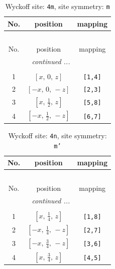 \documentclass[fleqn,8pt]{jsarticle}
\begin{document}
\renewcommand{\arraystretch}{1.2}
\begin{longtable}{ccc}
\caption{Wyckoff site: {\tt 4m}, site symmetry: {\tt m}}
 \\
 \hline \hline
No. & position & mapping \\ \hline \endfirsthead

\multicolumn{2}{l}{\tablename\ \thetable{}} \\
 \hline \hline
No. & position & mapping \\ \hline \endhead

 \hline \hline
\multicolumn{2}{r}{\footnotesize\it continued ...} \\ \endfoot

 \hline \hline
\multicolumn{2}{r}{} \\ \endlastfoot

1 & $\left[ x,\, 0,\, z \right]$ & {\tt [1,4]} \\ \hline
2 & $\left[ - x,\, 0,\, - z \right]$ & {\tt [2,3]} \\ \hline
3 & $\left[ x,\, \frac{1}{2},\, z \right]$ & {\tt [5,8]} \\ \hline
4 & $\left[ - x,\, \frac{1}{2},\, - z \right]$ & {\tt [6,7]} \\
\end{longtable}
\renewcommand{\arraystretch}{1.2}
\begin{longtable}{ccc}
\caption{Wyckoff site: {\tt 4n}, site symmetry: {\tt m'}}
 \\
 \hline \hline
No. & position & mapping \\ \hline \endfirsthead

\multicolumn{2}{l}{\tablename\ \thetable{}} \\
 \hline \hline
No. & position & mapping \\ \hline \endhead

 \hline \hline
\multicolumn{2}{r}{\footnotesize\it continued ...} \\ \endfoot

 \hline \hline
\multicolumn{2}{r}{} \\ \endlastfoot

1 & $\left[ x,\, \frac{1}{4},\, z \right]$ & {\tt [1,8]} \\ \hline
2 & $\left[ - x,\, \frac{1}{4},\, - z \right]$ & {\tt [2,7]} \\ \hline
3 & $\left[ - x,\, \frac{3}{4},\, - z \right]$ & {\tt [3,6]} \\ \hline
4 & $\left[ x,\, \frac{3}{4},\, z \right]$ & {\tt [4,5]} \\
\end{longtable}
\end{document}
